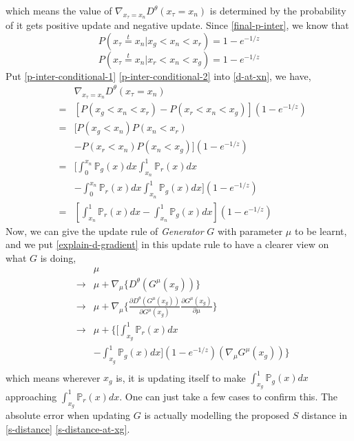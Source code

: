 \documentclass[letterpaper]{article} %
\begin{document}
which means the value of $\nabla_{x_{\tau}=x_n} D^{\theta}(x_{\tau}=x_n)$ is determined by the probability of it gets positive update and negative update.
Since \eqref{final-p-inter}, we know that
\begin{equation}\label{p-inter-conditional-1}
  P(x_\tau\overset{t}{=}x_n|x_g<x_n<x_r)=1 - e^{-1/z}
\end{equation}
\begin{equation}\label{p-inter-conditional-2}
  P(x_\tau\overset{t}{=}x_n|x_r<x_n<x_g)=1 - e^{-1/z}
\end{equation}
Put \eqref{p-inter-conditional-1} \eqref{p-inter-conditional-2} into \eqref{d-at-xn}, we have,
\begin{eqnarray}\label{explain-d-gradient}
    && \nabla_{x_{\tau}=x_n} D^{\theta}(x_{\tau}=x_n) \nonumber\\
    &=& [P(x_g<x_n<x_r) - P(x_r<x_n<x_g)](1 - e^{-1/z}) \nonumber\\
    &=& [P(x_g<x_n)P(x_n<x_r) \nonumber\\
    && - P(x_r<x_n)P(x_n<x_g)](1 - e^{-1/z}) \nonumber\\
    &=& [\int_{0}^{x_n}\mathbb{P}_g(x)dx \int_{x_n}^{1}\mathbb{P}_r(x)dx \nonumber\\
    && - \int_{0}^{x_n}\mathbb{P}_r(x)dx \int_{x_n}^{1}\mathbb{P}_g(x)dx](1 - e^{-1/z}) \nonumber\\
    &=& [\int_{x_n}^{1}\mathbb{P}_r(x)dx-\int_{x_n}^{1}\mathbb{P}_g(x)dx](1 - e^{-1/z})
\end{eqnarray}
Now, we can give the update rule of \textit{Generator} $G$ with parameter $\mu$ to be learnt, and we put \eqref{explain-d-gradient} in this update rule to have a clearer view on what $G$ is doing,
\begin{eqnarray}\label{g-loss}
  && \mu \nonumber\\
  & \longrightarrow & \mu + \nabla_{\mu} \{ D^{\theta}(G^{\mu}(x_g)) \} \nonumber\\
  & \longrightarrow & \mu + \nabla_{\mu} \{ \frac{\partial D^{\theta}(G^{\mu}(x_g))}{\partial G^{\mu}(x_g)} \frac{\partial G^{\mu}(x_g)}{\partial \mu} \} \nonumber\\
  & \longrightarrow & \mu + \{[\int_{x_g}^{1}\mathbb{P}_r(x)dx\nonumber\\
  && -\int_{x_g}^{1}\mathbb{P}_g(x)dx](1 - e^{-1/z})(\nabla_{\mu}G^{\mu}(x_g)) \} \nonumber\\
\end{eqnarray}
which means wherever $x_g$ is, it is updating itself to make $\int_{x_g}^{1}\mathbb{P}_g(x)dx$ approaching $\int_{x_g}^{1}\mathbb{P}_r(x)dx$.
One can just take a few cases to confirm this.
The absolute error when updating $G$ is actually modelling the proposed $S$ distance in \eqref{s-distance} \eqref{s-distance-at-xg}.
\end{document}
